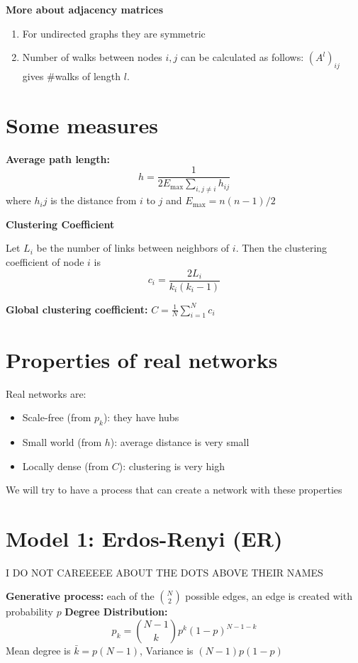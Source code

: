 \textbf{More about adjacency matrices}
\begin{enumerate}
    \item For undirected graphs they are symmetric
    \item Number of walks between nodes $i, j$ can be calculated as follows:
        $(A^l)_{ij}$ gives $\#$walks of length $l$.
\end{enumerate}

\section*{Some measures}

\textbf{Average path length:}
\[
h = \frac{1}{2E_{\text{max}} \sum_{i, j \ne i}h_{ij}}
\]
where $h_ij$ is the distance from $i$ to $j$ and $E_{\text{max}} = n(n-1)/2$

\textbf{Clustering Coefficient}

Let $L_i$  be the number of links between neighbors of $i$. 
Then the clustering coefficient of node $i$ is 
\[
c_i = \frac{2L_i}{k_i(k_i - 1)}
\]

\textbf{Global clustering coefficient:} $C = \frac{1}{N}\sum_{i=1}^{N}c_i$

\section*{Properties of real networks}
Real networks are: 
\begin{itemize}
    \item Scale-free (from $p_k$): they have hubs
    \item Small world (from $h$): average distance is very small 
    \item Locally dense (from $C$): clustering is very high
\end{itemize}

We will try to have a process that can create a network with these properties 

\section*{Model 1: Erdos-Renyi (ER)} I DO NOT CAREEEEE ABOUT THE DOTS ABOVE THEIR NAMES 


\textbf{Generative process:} each of the $\binom{N}{2}$ possible edges, an edge is created with 
probability $p$
\textbf{Degree Distribution:} 
\[
p_k = \binom{N-1}{k}p^k (1-p)^{N-1-k}
\]
Mean degree is $\bar{k} = p(N-1)$, Variance is $(N-1)p(1-p)$

